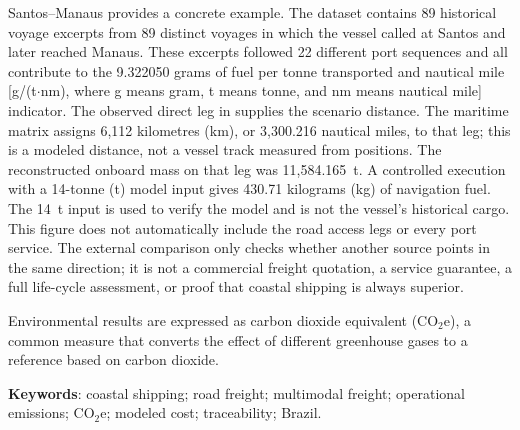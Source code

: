 \documentclass[12pt,a4paper,oneside]{report}
\newcommand{\cooe}{CO$_2$e}
\newcommand{\codecell}[1]{\texttt{\seqsplit{#1}}}
\begin{document}
Santos--Manaus provides a concrete example. The dataset contains 89 historical voyage excerpts from 89 distinct voyages in which the vessel called at Santos and later reached Manaus. These excerpts followed 22 different port sequences and all contribute to the 9.322050 grams of fuel per tonne transported and nautical mile [g/(t$\cdot$nm), where g means gram, t means tonne, and nm means nautical mile] indicator. The observed direct leg in \codecell{voyage\_9612789\_00004} supplies the scenario distance. The maritime matrix assigns 6,112 kilometres (km), or 3,300.216 nautical miles, to that leg; this is a modeled distance, not a vessel track measured from positions. The reconstructed onboard mass on that leg was 11,584.165~t. A controlled execution with a 14-tonne (t) model input gives 430.71 kilograms (kg) of navigation fuel. The 14~t input is used to verify the model and is not the vessel's historical cargo. This figure does not automatically include the road access legs or every port service. The external comparison only checks whether another source points in the same direction; it is not a commercial freight quotation, a service guarantee, a full life-cycle assessment, or proof that coastal shipping is always superior.

Environmental results are expressed as carbon dioxide equivalent (\cooe{}), a common measure that converts the effect of different greenhouse gases to a reference based on carbon dioxide.

\textbf{Keywords}: coastal shipping; road freight; multimodal freight; operational emissions; \cooe{}; modeled cost; traceability; Brazil.

\cleardoublepage
\end{document}
